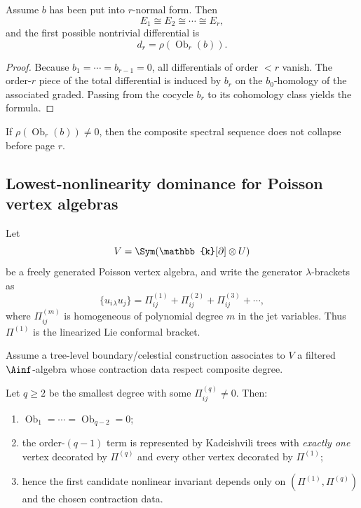 \begin{theorem}
\label{thm:cbt-spectral-obstruction}
\ClaimStatusProvedHere
Assume $b$ has been put into $r$-normal form. Then
\[
E_1\cong E_2\cong\cdots\cong E_r,
\]
and the first possible nontrivial differential is
\[
d_r=\rho(\operatorname{Ob}_r(b)).
\]
\end{theorem}

\begin{proof}
Because $b_1=\cdots=b_{r-1}=0$, all differentials of order $<r$ vanish. The order-$r$ piece of the total differential is induced by $b_r$ on the $b_0$-homology of the associated graded. Passing from the cocycle $b_r$ to its cohomology class yields the formula.
\end{proof}

\begin{corollary}
\label{cor:cbt-spectral-noncollapse}
\ClaimStatusProvedHere
If $\rho(\operatorname{Ob}_r(b))\neq0$, then the composite spectral sequence does not collapse before page $r$.
\end{corollary}

\subsection{Lowest-nonlinearity dominance for Poisson vertex algebras}
\label{sec:cbt-lowest-nonlinearity}

Let
\[
V=\Sym(\mathbb{k}[\partial]\otimes U)
\]
be a freely generated Poisson vertex algebra, and write the generator $\lambda$-brackets as
\[
\{u_i{}_\lambda u_j\}
=
\Pi^{(1)}_{ij}
+\Pi^{(2)}_{ij}
+\Pi^{(3)}_{ij}
+\cdots,
\]
where $\Pi^{(m)}_{ij}$ is homogeneous of polynomial degree $m$ in the jet variables. Thus $\Pi^{(1)}$ is the linearized Lie conformal bracket.

Assume a tree-level boundary/celestial construction associates to $V$ a filtered $\Ainf$-algebra whose contraction data respect composite degree.

\begin{theorem}
\label{thm:cbt-lowest-nonlinearity}
\ClaimStatusProvedHere
Let $q\ge2$ be the smallest degree with some $\Pi^{(q)}_{ij}\neq0$. Then:
\begin{enumerate}[label=\textup{(\roman*)},leftmargin=2em]
\item $\operatorname{Ob}_1=\cdots=\operatorname{Ob}_{q-2}=0$;
\item the order-$(q-1)$ term is represented by Kadeishvili trees with \emph{exactly one} vertex decorated by $\Pi^{(q)}$ and every other vertex decorated by $\Pi^{(1)}$;
\item hence the first candidate nonlinear invariant depends only on $(\Pi^{(1)},\Pi^{(q)})$ and the chosen contraction data.
\end{enumerate}
\end{theorem}


